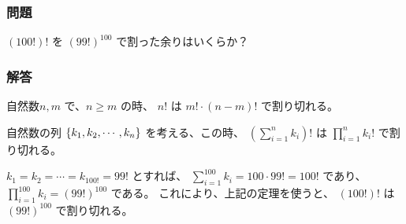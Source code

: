 \subsubsection{問題}
\label{sssec:階乗:階乗の階乗を割った余り:問題}

$(100 !)!$ を $(99!)^{100}$ で割った余りはいくらか？


\clearpage
\subsubsection{解答}
\label{sssec:階乗:階乗の階乗を割った余り:解答}

\begin{Lemma}
  自然数$n,m$ で、$n \ge m$ の時、
  $n!$ は $m! \cdot (n-m)!$ で割り切れる。
\end{Lemma}

\begin{Theorem}
  自然数の列 $\left\{ k_1, k_2, \cdots, k_n \right\}$ を考える、この時、
  $\left( \sum_{i=1}^{n} k_i \right) !$ は
  $\prod_{i=1}^{n} k_i !$ で割り切れる。
\end{Theorem}

$k_1 = k_2 = \cdots = k_{100!} = 99!$ とすれば、
$\sum_{i=1}^{100} k_i = 100 \cdot 99! = 100!$ であり、
$\prod_{i=1}^{100} k_i = (99!)^{100} $ である。
これにより、上記の定理を使うと、
$(100!)!$ は $(99!)^{100}$ で割り切れる。
\QED



